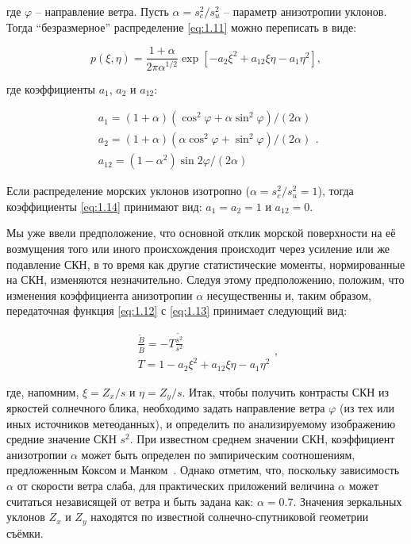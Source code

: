 \noindent где $\varphi $ -- направление ветра. Пусть $\alpha =s_{c}^{2} /s_{u}^{2} $ -- параметр анизотропии уклонов. Тогда ``безразмерное'' распределение \eqref{eq:1.11} можно переписать в виде:


\begin{equation} \label{eq:1.13} 
p(\xi ,\eta )=\frac{1+\alpha }{2\pi \alpha ^{1/2} } \exp \left[-a_{2} \xi ^{2} +a_{12} \xi \eta -a_{1} \eta ^{2} \right],  
\end{equation} 

\noindent где коэффициенты $a_{1} $, $a_{2} $ и $a_{12} $:


\begin{equation} \label{eq:1.14} 
\begin{array}{l} {a_{1}^{} =(1+\alpha )(\cos ^{2} \varphi +\alpha \sin ^{2} \varphi )/(2\alpha )} \\ {a_{2}^{} =(1+\alpha )(\alpha \cos ^{2} \varphi +\sin ^{2} \varphi )/(2\alpha )} \\ {a_{12}^{} =(1-\alpha ^{2} )\sin 2\varphi /(2\alpha )} \end{array}.  
\end{equation} 


Если распределение морских уклонов изотропно ($\alpha =s_{c}^{2} /s_{u}^{2} =1$), тогда коэффициенты \eqref{eq:1.14} принимают вид: $a_{1} =a_{2} =1$ и $a_{12} =0$.

Мы уже ввели предположение, что основной отклик морской поверхности на её возмущения того или иного происхождения происходит через усиление или же подавление СКН, в то время как другие статистические моменты, нормированные на СКН, изменяются незначительно. Следуя этому предположению, положим, что изменения коэффициента анизотропии $\alpha $ несущественны и, таким образом, передаточная функция \eqref{eq:1.12} с \eqref{eq:1.13} принимает следующий вид:


\begin{equation} \label{eq:1.15} 
\begin{array}{l} {\frac{\widetilde{B}}{\overline{B}} =-T\frac{\widetilde{s^{2} }}{s^{2} } } \\ {T=1-a_{2} \xi ^{2} +a_{12} \xi \eta -a_{1} \eta ^{2} } \end{array},  
\end{equation} 


\noindent где, напомним, $\xi =Z_{x} /s$ и $\eta =Z_{y} /s$. Итак, чтобы получить контрасты СКН из яркостей солнечного блика, необходимо задать направление ветра $\varphi $ (из тех или иных источников метеоданных), и определить по анализируемому изображению средние значение СКН $s^{2} $. При известном среднем значении СКН, коэффициент анизотропии $\alpha $ может быть определен по эмпирическим соотношениям, предложенным Коксом и Манком~\citep{Cox1954}. Однако отметим, что, поскольку зависимость $\alpha $ от скорости ветра слаба, для практических приложений величина $\alpha $ может считаться независящей от ветра и быть задана как: $\alpha =0.7$. Значения зеркальных уклонов $Z_{x} $ и $Z_{y} $ находятся по известной солнечно-спутниковой геометрии съёмки.



